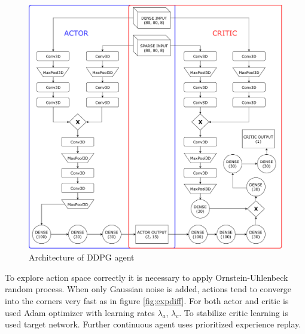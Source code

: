 \begin{figure}[!h]
\centering
\includegraphics[scale=0.55]{fig/ddpg.pdf}
\caption{Architecture of DDPG agent}
\label{fig:ddpg}
\end{figure}

\pagebreak
To explore action space correctly it is necessary to apply Ornstein-Uhlenbeck random process. When only Gaussian noise is added, actions tend to converge into the corners very fast as in figure \ref{fig:expdiff}. For both actor and critic is used Adam optimizer with learning rates $\lambda_{a}$, $\lambda_{c}$. To stabilize critic learning is used target network. Further continuous agent uses prioritized experience replay.

